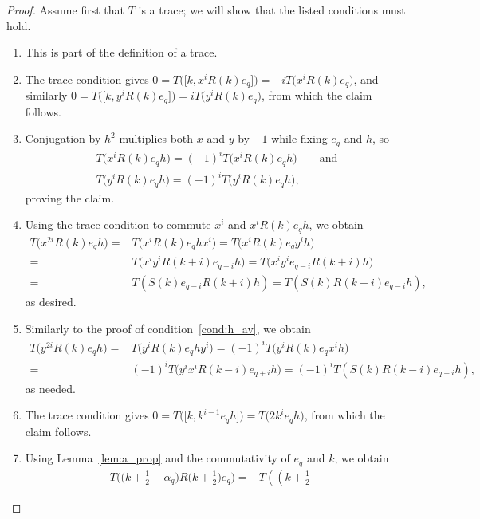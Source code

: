 \documentclass[10pt,a4paper]{amsart}
\newcommand\half{\ensuremath{\frac{1}{2}}}
\newcommand\numbers{\textup{(\arabic*)}}
\newcommand\thalf{\ensuremath{\tfrac12}}
\begin{document}
\begin{proof}
 Assume first that $T$ is a trace;
 we will show that the listed conditions must hold.
 \begin{enumerate}[label=\numbers]\itemsep=0pt
 \item This is part of the definition of a trace.
 \item The trace condition gives
 $0 = T\bigl(\big[k, x^i R(k) e_q\big]\bigr) = -i T\bigl(x^i R(k) e_q\bigr)$,
 and similarly
 $0 = T\bigl(\big[k, y^i R(k) e_q\big]\bigr) = i T\bigl(y^i R(k) e_q\bigr)$,
 from which the claim follows.
 \item Conjugation by $h^2$ multiplies both $x$ and $y$ by $-1$
 while fixing $e_q$ and $h$, so
 \begin{gather*}
 T\bigl(x^i R(k) e_q h\bigr) = (-1)^i T\bigl(x^i R(k) e_q h\bigr) \qquad \text{and}\\
T\bigl(y^i R(k) e_q h\bigr) = (-1)^i T\bigl(y^i R(k) e_q h\bigr),\end{gather*}
 proving the claim.
 \item Using the trace condition
 to commute $x^i$ and $x^i R(k) e_q h$,
 we obtain
 \begin{align*}
 T\bigl(x^{2i} R(k) e_q h\bigr)
 ={}& T\bigl(x^i R(k) e_q h x^i\bigr)= T\bigl(x^i R(k) e_q y^i h\bigr) \\
 ={}& T\bigl(x^i y^i R(k + i) e_{q - i} h\bigr) = T\bigl(x^i y^i e_{q - i} R(k + i) h\bigr) \\
 ={}& T(S(k) e_{q - i} R(k + i) h) = T(S(k) R(k + i) e_{q - i} h),
 \end{align*}
 as desired.
 \item Similarly to the proof of condition~\ref{cond:h_av},
 we obtain
 \begin{align*}
 T\bigl(y^{2i} R(k) e_q h\bigr)
 ={}& T\bigl(y^i R(k) e_q h y^i\bigr)= (-1)^i T\bigl(y^i R(k) e_q x^i h\bigr) \\
 ={}& (-1)^i T\bigl(y^i x^i R(k - i) e_{q + i} h\bigr) = (-1)^i T(S(k) R(k - i) e_{q + i} h),
 \end{align*}
 as needed.
 \item The trace condition gives
 $0 = T\bigl(\big[k, k^{i - 1} e_q h\big]\bigr) = T\bigl(2 k^i e_q h\bigr)$,
 from which the claim follows.
 \item Using Lemma~\ref{lem:a_prop}
 and the commutativity of $e_q$ and $k$, we obtain
 \begin{align*}
 T\bigl( \bigl( k + \thalf - \alpha_q \bigr)
 R\bigl( k + \thalf \bigr) e_q \bigr)
 ={}& T\left( \left( k + \half -

\end{align*}
\end{enumerate}
\end{proof}
\end{document}
